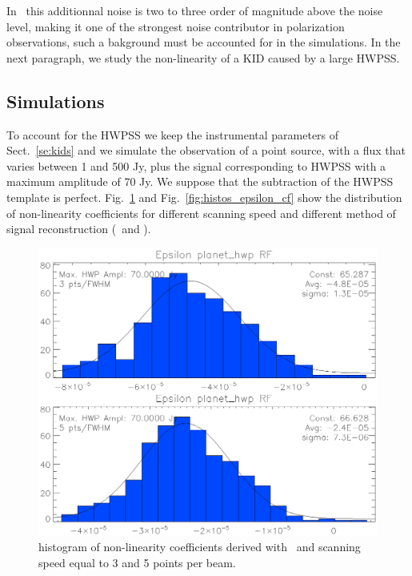 In \nikad\ this additionnal noise is two to three order of magnitude above the noise level, making it one of the strongest noise contributor in polarization observations, such a bakground must be accounted for in the simulations. In the next paragraph, we study the non-linearity of a KID caused by a large HWPSS. 


\subsection{Simulations}

To account for the HWPSS we keep the instrumental parameters of Sect.~\ref{se:kids} and we simulate the observation of a point source, with a flux that varies between 1 and 500 Jy, plus the signal corresponding to HWPSS with a maximum amplitude of 70 Jy. We suppose that the subtraction of the HWPSS template is perfect. Fig.~\ref{fig:histos_epsilon_rf} and Fig.~\ref{fig:histos_epsilon_cf} show the distribution of non-linearity coefficients for different scanning speed and different method of signal reconstruction (\rf\ and \cf). 

\begin{figure}
	\includegraphics[clip, angle=0, width=\columnwidth]{Figures/histos_epsilon_rf.eps}
	\caption{histogram of non-linearity coefficients derived with \rf\ and scanning speed equal to 3 and 5 points per beam.}
	\label{fig:histos_epsilon_rf}
\end{figure}

